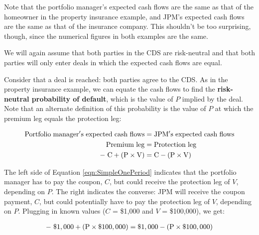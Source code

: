 \documentclass{jss}
\begin{document}
Note that the portfolio manager's expected cash flows are the same as that of the homeowner in the property insurance example, and JPM's expected cash flows are the same as that of the insurance company. This shouldn't be too surprising, though, since the numerical figures in both examples are the same.

We will again assume that both parties in the CDS are risk-neutral and that both parties will only enter deals in which the expected cash flows are equal.

Consider that a deal is reached: both parties agree to the CDS. As in the property insurance example, we can equate the cash flows to find the \textbf{risk-neutral probability of default}, which is the value of $P$ implied by the deal. Note that an alternate definition of this probability is the value of $P$ at which the premium leg equals the protection leg:

\label{eqn:SimpleOnePeriod}
\begin{align}
   \rm Portfolio\hspace{3pt}manager's\hspace{3pt}expected\hspace{3pt}cash\hspace{3pt}flows &= \rm JPM's\hspace{3  pt}expected\hspace{3pt}cash\hspace{3pt}flows \\
   \rm Premium\hspace{3pt}leg &= \rm Protection\hspace{3pt}leg \\
   \rm -\hspace{3pt}C + (P \times V)  &= \rm C - (P \times V)
\end{align}

The left side of Equation \ref{eqn:SimpleOnePeriod} indicates that the portfolio manager has to pay the coupon, $C$, but could receive the protection leg of $V$, depending on $P$. The right indicates the converse: JPM will receive the coupon payment, $C$, but could potentially have to pay the protection leg of $V$, depending on $P$.
Plugging in known values ($C$ = \$1,000 and $V$ = \$100,000), we get:

\begin{equation}
 \begin{aligned}
   {\rm -\hspace{3pt}\$1,000 + (P \times {\$100,000})  = \$1,000 - (P \times {\$100,000})}
    \end{aligned}
\end{equation}
\end{document}

